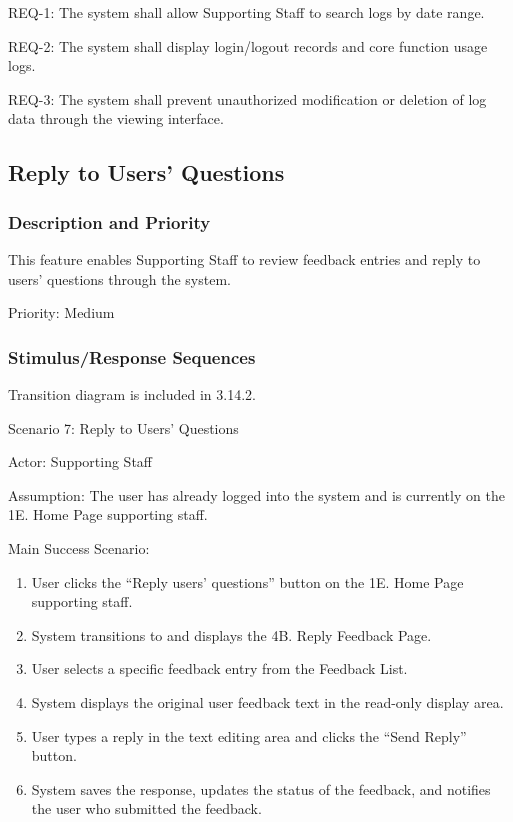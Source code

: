REQ-1: The system shall allow Supporting Staff to search logs by date range.

REQ-2: The system shall display login/logout records and core function usage logs.

REQ-3: The system shall prevent unauthorized modification or deletion of log data through the viewing interface.

\subsection{Reply to Users' Questions}

\subsubsection{Description and Priority}

This feature enables Supporting Staff to review feedback entries and reply to users' questions through the system.

Priority: Medium

\subsubsection{Stimulus/Response Sequences}

Transition diagram is included in 3.14.2.

Scenario 7: Reply to Users' Questions

Actor: Supporting Staff

Assumption: The user has already logged into the system and is currently on the 1E. Home Page supporting staff.

Main Success Scenario:
\begin{enumerate}
\item User clicks the ``Reply users' questions'' button on the 1E. Home Page supporting staff.
\item System transitions to and displays the 4B. Reply Feedback Page.
\item User selects a specific feedback entry from the Feedback List.
\item System displays the original user feedback text in the read-only display area.
\item User types a reply in the text editing area and clicks the ``Send Reply'' button.
\item System saves the response, updates the status of the feedback, and notifies the user who submitted the feedback.
\end{enumerate}

